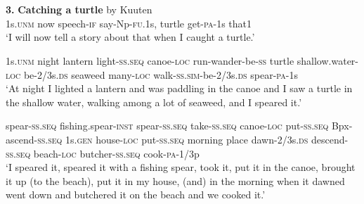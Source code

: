 {%
\section{}
\textbf{3.  }\textbf{Catching a turtle}  by Kuuten
\ea\label{ex:a:x1}
 \\
1s.\textsc{unm}  now  speech-\textsc{if}  say-Np-\textsc{fu}.1s,  turtle  get-\textsc{pa}-1s  that1 \\
\glt ‘I will now tell a story about that when I caught a turtle.’ \\
\z


\ea\label{ex:a:x2}
1s.\textsc{unm}  night  lantern  light-\textsc{ss.seq}  canoe-\textsc{loc}  run-wander-be-\textsc{ss}  turtle  shallow.water-\textsc{loc}  be-2/3s.\textsc{ds}  seaweed  many-\textsc{loc} walk-\textsc{ss}.\textsc{sim}-be-2/3s.\textsc{ds}  spear-\textsc{pa}-1s \\




\glt ‘At night I lighted a lantern and was paddling in the canoe and I saw a turtle in the shallow water, walking among a lot of seaweed, and I speared it.’ \\
\z


\ea\label{ex:a:x3}
spear-\textsc{ss.seq}  fishing.spear-\textsc{inst}  spear-\textsc{ss.seq}  take-\textsc{ss.seq}  canoe-\textsc{loc}  put-\textsc{ss.seq}  Bpx-ascend-\textsc{ss.seq}  1s.\textsc{gen}  house-\textsc{loc}  put-\textsc{ss.seq}  morning  place  dawn-2/3s.\textsc{ds}  descend-\textsc{ss.seq}   beach-\textsc{loc}  butcher{}-\textsc{ss.seq}  cook-\textsc{pa}-1/3p \\






\glt ‘I speared it, speared it with a fishing spear, took it, put it in the canoe, brought it up (to the beach), put it in my house, (and) in the morning when it dawned went down and butchered it on the beach and we cooked it.’ \\
\z


}
